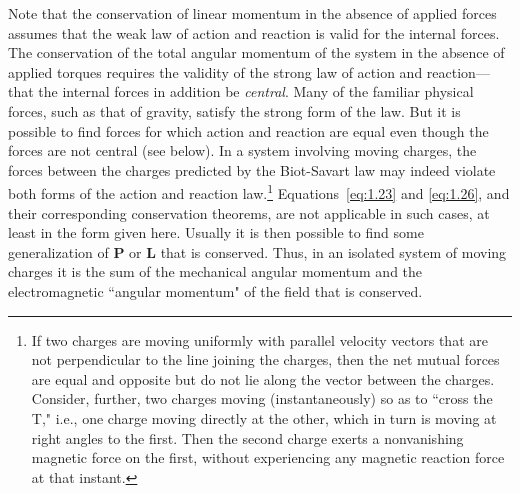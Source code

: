 Note that the conservation of linear momentum in the absence of applied forces assumes that the weak law of action and reaction is valid for the internal forces. The conservation of the total angular momentum of the system in the absence of applied torques requires the validity of the strong law of action and reaction—that the internal forces in addition be \emph{central}. Many of the familiar physical forces, such as that of gravity, satisfy the strong form of the law. But it is possible to find forces for which action and reaction are equal even though the forces are not central (see below). In a system involving moving charges, the forces between the charges predicted by the Biot-Savart law may indeed violate both forms of the action and reaction law.\footnote{If two charges are moving uniformly with parallel velocity vectors that are not perpendicular to the line joining the charges, then the net mutual forces are equal and opposite but do not lie along the vector between the charges. Consider, further, two charges moving (instantaneously) so as to ``cross the T," i.e., one charge moving directly at the other, which in turn is moving at right angles to the first. Then the second charge exerts a nonvanishing magnetic force on the first, without experiencing any magnetic reaction force at that instant.} Equations~\eqref{eq:1.23} and \eqref{eq:1.26}, and their corresponding conservation theorems, are not applicable in such cases, at least in the form given here. Usually it is then possible to find some generalization of \(\symbf{P}\) or \(\symbf{L}\) that is conserved. Thus, in an isolated system of moving charges it is the sum of the mechanical angular momentum and the electromagnetic ``angular momentum" of the field that is conserved.

